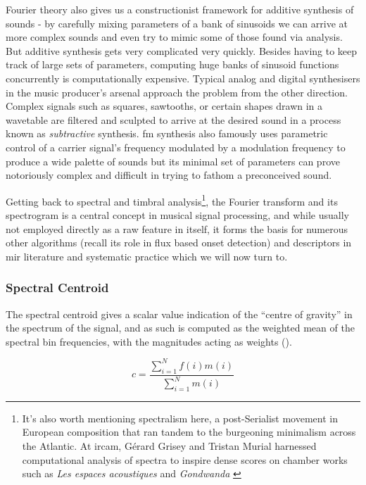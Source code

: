 {{Fourier theory also gives us a constructionist framework for additive synthesis of sounds - by carefully mixing parameters of a bank of sinusoids we can arrive at more complex sounds and even try to mimic some of those found via analysis. But additive synthesis gets very complicated very quickly. Besides having to keep track of large sets of parameters, computing huge banks of sinusoid functions concurrently is computationally expensive. Typical analog and digital synthesisers in the music producer's arsenal approach the problem from the other direction. Complex signals such as squares, sawtooths, or certain shapes drawn in a wavetable are filtered and sculpted to arrive at the desired sound in a process known as \textit{subtractive} synthesis. \acrfull{fm} synthesis also famously uses parametric control of a carrier signal's frequency modulated by a modulation frequency to produce a wide palette of sounds but its minimal set of parameters can prove notoriously complex and difficult in trying to fathom a preconceived sound. 
 
Getting back to spectral and timbral analysis\footnote{It's also worth mentioning spectralism here, a post-Serialist movement in European composition that ran tandem to the burgeoning minimalism across the Atlantic. At \acrshort{ircam}, Gérard Grisey and Tristan Murial harnessed computational analysis of spectra to inspire dense scores on chamber works such as \textit{Les espaces acoustiques} and \textit{Gondwanda} \citep{ross2007rest, Harvey2000}}, the Fourier transform and its spectrogram is a central concept in musical signal processing, and while usually not employed directly as a raw feature in itself, it forms the basis for numerous other algorithms (recall its role in flux based onset detection) and descriptors in \acrshort{mir} literature and systematic practice which we will now turn to. 

\subsubsection{Spectral Centroid}

The spectral centroid gives a scalar value indication of the ``centre of gravity'' in the spectrum of the signal, and as such is computed as the weighted mean of the spectral bin frequencies, with the magnitudes acting as weights ().

\begin{equation}
\label{eq:centroid}	
c = \frac{\sum_{i=1}^{N}f(i)m(i)}{\sum_{i=1}^{N}m(i)}
\end{equation}

}}

